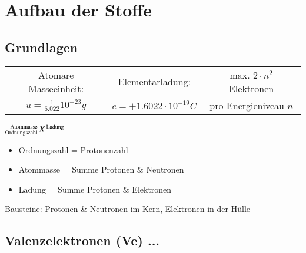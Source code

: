 \section{Aufbau der Stoffe}

\subsection{Grundlagen}
\begin{center}
    \begin{tabular}{|c|c|c|}\hline
        Atomare Masseeinheit:               & Elementarladung:         & max. $2 \cdot n^{2}$ Elektronen \\ 
        $u = \frac{1}{6.022}10^{-23}g$      & $e = \pm 1.6022 \cdot 10^{-19}C$ & pro Energieniveau $n$ \\ \hline
    \end{tabular}
\end{center}


\begin{minipage}{0.25\linewidth}
    $ \prescript{\text{Atommasse }}{\text{Ordnungszahl }}{X}^{\text{ Ladung}} $
\end{minipage}
\hfill
\begin{minipage}{0.65\linewidth}
    \begin{itemize}[itemsep=1pt, parsep=0pt]
        \item Ordnungszahl = Protonenzahl
        \item Atommasse = Summe Protonen \& Neutronen
        \item Ladung = Summe Protonen \& Elektronen
    \end{itemize}
\end{minipage}

Bausteine: Protonen \& Neutronen im Kern, Elektronen in der Hülle

\subsection{Valenzelektronen (Ve) ...}

